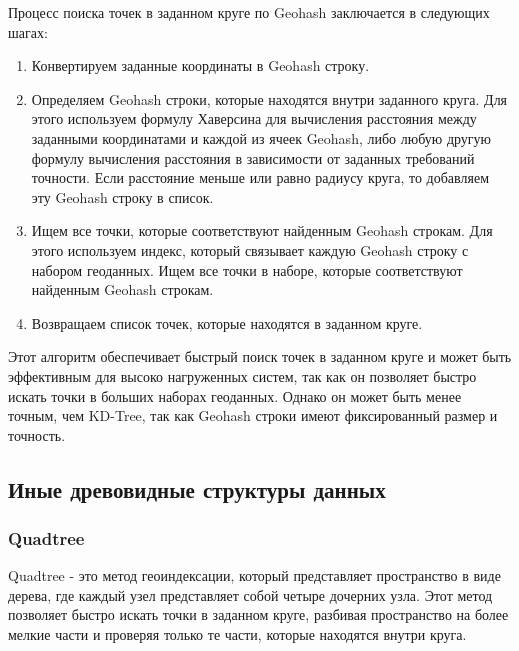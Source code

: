 Процесс поиска точек в заданном круге по Geohash заключается в следующих шагах:
\begin{enumerate}
    \item Конвертируем заданные координаты в Geohash строку.
    \item Определяем Geohash строки, которые находятся внутри заданного круга. Для этого используем формулу Хаверсина для вычисления расстояния между заданными координатами и каждой из ячеек Geohash, либо любую другую формулу вычисления расстояния в зависимости от заданных требований точности. Если расстояние меньше или равно радиусу круга, то добавляем эту Geohash строку в список.
    \item Ищем все точки, которые соответствуют найденным Geohash строкам. Для этого используем индекс, который связывает каждую Geohash строку с набором геоданных. Ищем все точки в наборе, которые соответствуют найденным Geohash строкам.
    \item Возвращаем список точек, которые находятся в заданном круге.
\end{enumerate}

Этот алгоритм обеспечивает быстрый поиск точек в заданном круге и может быть эффективным для высоко нагруженных систем, так как он позволяет быстро искать точки в больших наборах геоданных. Однако он может быть менее точным, чем KD-Tree, так как Geohash строки имеют фиксированный размер и точность.

\subsection{Иные древовидные структуры данных}

\subsubsection{Quadtree}
Quadtree - это метод геоиндексации, который представляет пространство в виде дерева, где каждый узел представляет собой четыре дочерних узла. Этот метод позволяет быстро искать точки в заданном круге, разбивая пространство на более мелкие части и проверяя только те части, которые находятся внутри круга.

